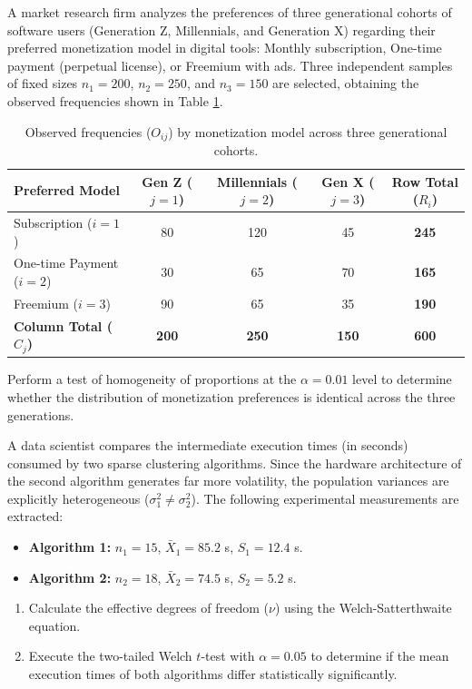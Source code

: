 \begin{problema}
	\label{prob:homogeneidad_contingencia}
	A market research firm analyzes the preferences of three generational cohorts of software users (Generation Z, Millennials, and Generation X) regarding their preferred monetization model in digital tools: Monthly subscription, One-time payment (perpetual license), or Freemium with ads. Three independent samples of fixed sizes $n_1 = 200$, $n_2 = 250$, and $n_3 = 150$ are selected, obtaining the observed frequencies shown in Table \ref{tab:homog_obs}.
	\begin{table}[h!]
		\centering
		\begin{tabular}{lcccc}
			\hline
			\textbf{Preferred Model} & \textbf{Gen Z ($j=1$)} & \textbf{Millennials ($j=2$)} & \textbf{Gen X ($j=3$)} & \textbf{Row Total ($R_i$)} \\ \hline
			Subscription ($i=1$) & 80 & 120 & 45 & \textbf{245} \\
			One-time Payment ($i=2$) & 30 & 65 & 70 & \textbf{165} \\
			Freemium ($i=3$) & 90 & 65 & 35 & \textbf{190} \\ \hline
			\textbf{Column Total ($C_j$)} & \textbf{200} & \textbf{250} & \textbf{150} & \textbf{600} \\ \hline
		\end{tabular}
		\caption{Observed frequencies ($O_{ij}$) by monetization model across three generational cohorts.}
		\label{tab:homog_obs}
	\end{table}
	
	Perform a test of homogeneity of proportions at the $\alpha = 0.01$ level to determine whether the distribution of monetization preferences is identical across the three generations.
\end{problema}

\begin{problema}
	\label{prob:doc_welch_hetero}
	A data scientist compares the intermediate execution times (in seconds) consumed by two sparse clustering algorithms. Since the hardware architecture of the second algorithm generates far more volatility, the population variances are explicitly heterogeneous ($\sigma_1^2 \neq \sigma_2^2$). The following experimental measurements are extracted:
	\begin{itemize}
		\item \textbf{Algorithm 1:} $n_1 = 15$, $\bar{X}_1 = 85.2$ s, $S_1 = 12.4$ s.
		\item \textbf{Algorithm 2:} $n_2 = 18$, $\bar{X}_2 = 74.5$ s, $S_2 = 5.2$ s.
	\end{itemize}
	\begin{enumerate}
		\item Calculate the effective degrees of freedom ($\nu$) using the Welch-Satterthwaite equation.
		\item Execute the two-tailed Welch $t$-test with $\alpha = 0.05$ to determine if the mean execution times of both algorithms differ statistically significantly.
	\end{enumerate}
\end{problema}

